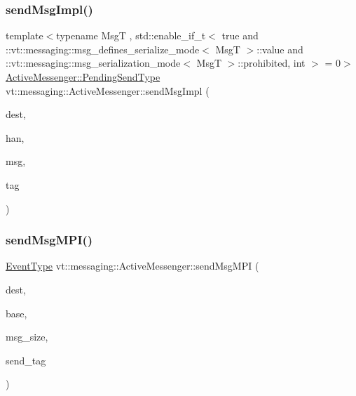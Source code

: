 \subsubsection{\texorpdfstring{send\+Msg\+Impl()}{sendMsgImpl()}\hspace{0.1cm}{\footnotesize\ttfamily [4/4]}}
{\footnotesize\ttfamily template$<$typename MsgT , std\+::enable\+\_\+if\+\_\+t$<$ true and \+::vt\+::messaging\+::msg\+\_\+defines\+\_\+serialize\+\_\+mode$<$ Msg\+T $>$\+::value and \+::vt\+::messaging\+::msg\+\_\+serialization\+\_\+mode$<$ Msg\+T $>$\+::prohibited, int $>$  = 0$>$ \\
\hyperlink{structvt_1_1messaging_1_1_active_messenger_a3626a6ca76d8ad4ec7c3b47a2c70d3a8}{Active\+Messenger\+::\+Pending\+Send\+Type} vt\+::messaging\+::\+Active\+Messenger\+::send\+Msg\+Impl (\begin{DoxyParamCaption}\item[{\hyperlink{namespacevt_a866da9d0efc19c0a1ce79e9e492f47e2}{Node\+Type}}]{dest,  }\item[{\hyperlink{namespacevt_af64846b57dfcaf104da3ef6967917573}{Handler\+Type}}]{han,  }\item[{\hyperlink{structvt_1_1messaging_1_1_msg_shared_ptr}{Msg\+Shared\+Ptr}$<$ MsgT $>$ \&}]{msg,  }\item[{\hyperlink{namespacevt_a84ab281dae04a52a4b243d6bf62d0e52}{Tag\+Type}}]{tag }\end{DoxyParamCaption})\hspace{0.3cm}{\ttfamily [inline]}}

\mbox{\label{structvt_1_1messaging_1_1_active_messenger_ad1406c7f73624f030a0d74dd210ca9d6}} 
\subsubsection{\texorpdfstring{send\+Msg\+M\+P\+I()}{sendMsgMPI()}}
{\footnotesize\ttfamily \hyperlink{namespacevt_a009267401def7ae8bf201892222d060f}{Event\+Type} vt\+::messaging\+::\+Active\+Messenger\+::send\+Msg\+M\+PI (\begin{DoxyParamCaption}\item[{\hyperlink{namespacevt_a866da9d0efc19c0a1ce79e9e492f47e2}{Node\+Type} const \&}]{dest,  }\item[{\hyperlink{structvt_1_1messaging_1_1_msg_shared_ptr}{Msg\+Shared\+Ptr}$<$ \hyperlink{namespacevt_a44d0d4e144748f2b19a1cfd962f50338}{Base\+Msg\+Type} $>$ const \&}]{base,  }\item[{\hyperlink{namespacevt_a408e86a8c7c89309b52907dc5a513924}{Msg\+Size\+Type} const \&}]{msg\+\_\+size,  }\item[{\hyperlink{namespacevt_a84ab281dae04a52a4b243d6bf62d0e52}{Tag\+Type} const \&}]{send\+\_\+tag }\end{DoxyParamCaption})}



